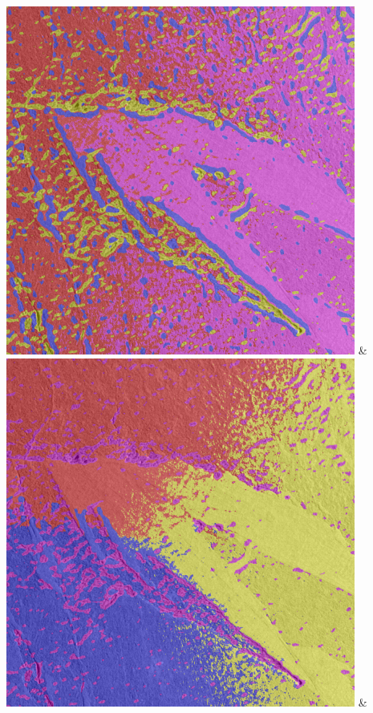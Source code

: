 \begin{table}[h!]
\begin{tabularx}{\textwidth}
		\includegraphics[width=0.9\linewidth]{images/gen/spatial_weight/p03_03.png_1.00.png} &
		\includegraphics[width=0.9\linewidth]{images/gen/spatial_weight/p03_03.png_1.33.png} &

\end{tabularx}
\end{table}
